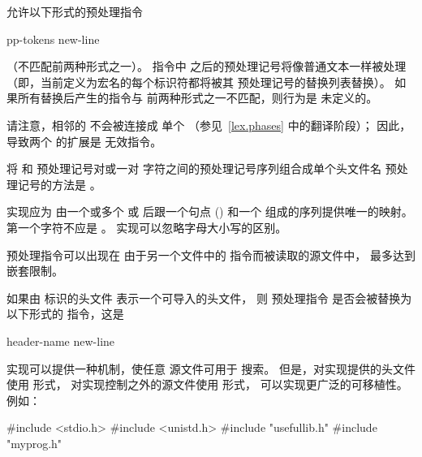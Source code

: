     \pnum
    允许以下形式的预处理指令
    \begin{ncsimplebnf}
     pp-tokens new-line
    \end{ncsimplebnf}
    （不匹配前两种形式之一）。
    指令中
    之后的预处理记号将像普通文本一样被处理
    （即，当前定义为宏名的每个标识符都将被其
    预处理记号的替换列表替换）。
    如果所有替换后产生的指令与
    前两种形式之一不匹配，则行为是
    未定义的。
    \begin{footnote}
    请注意，相邻的  不会被连接成
    单个 
    （参见~\ref{lex.phases} 中的翻译阶段）；
    因此，导致两个  的扩展是
    无效指令。
    \end{footnote}
    将
    \tcode{<}
    和
    \tcode{>}
    预处理记号对或一对
    字符之间的预处理记号序列组合成单个头文件名
    预处理记号的方法是 。
    
    \pnum
    实现应为
    由一个或多个
     或 
    后跟一个句点
    ()
    和一个 
    组成的序列提供唯一的映射。
    第一个字符不应是 。
    实现可以忽略字母大小写的区别。
    
    \pnum
    预处理指令可以出现在
    由于另一个文件中的
    指令而被读取的源文件中，
    最多达到  嵌套限制。
    
    \pnum
    如果由  标识的头文件
    表示一个可导入的头文件，
    则  预处理指令
    是否会被替换为以下形式的  指令，这是
    \begin{ncbnf}
     header-name \terminal{;} new-line
    \end{ncbnf}
    
    \pnum
    \begin{note}
    实现可以提供一种机制，使任意
    源文件可用于 \tcode{< >} 搜索。
    但是，对实现提供的头文件使用 \tcode{< >} 形式，
    对实现控制之外的源文件使用  形式，
    可以实现更广泛的可移植性。例如：
    
    \begin{codeblock}
    #include <stdio.h>
    #include <unistd.h>
    #include "usefullib.h"
    #include "myprog.h"
    \end{codeblock}
    
    \end{note}
    
